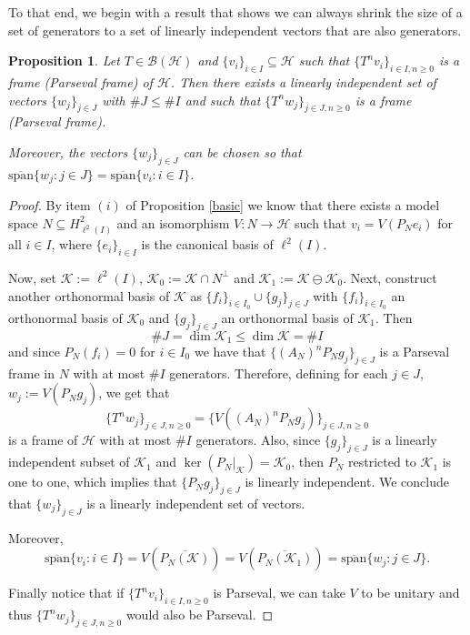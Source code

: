 \documentclass[a4paper,12pt]{amsart}
\def\cB{{\mathcal{B}}}
\def\HH{{\mathcal{H}}}
\def\KK{{\mathcal{K}}}
\def\osp{{\overline{\textrm{span}}}}
\newtheorem{proposition}[theorem]{Proposition}
\theoremstyle{definition}
\begin{document}
To that end, we begin with a result that shows we can always shrink the size of a set of generators to a set of linearly independent vectors that are also generators.
\begin{proposition}\label{lig}
Let $T\in\cB(\HH)$ and $\{v_i\}_{i\in I}\subseteq\HH$ such that $\{T^nv_i\}_{i\in I,n\geqslant0}$ is a frame (Parseval frame) of $\HH$. Then there exists a linearly independent set of vectors $\{w_j\}_{j\in J}$ with $\#J\leqslant\#I$ and such that $\{T^nw_j\}_{j\in J,n\geqslant0}$ is a frame (Parseval frame). 

Moreover, the vectors $\{w_j\}_{j\in J}$ can be chosen so that $\osp\{w_j:j\in J\}=\osp\{v_i:i\in I\}$.
\end{proposition}
\begin{proof}
By item $(i)$ of Proposition \ref{basic} we know that there exists a model space $N\subseteq H^2_{\ell^2(I)}$ and an isomorphism $V:N\to\HH$ such that $v_i=V(P_Ne_i)$ for all $i\in I$, where $\{e_i\}_{i\in I}$ is the canonical basis of $\ell^2(I)$. 

Now, set $\KK:=\ell^2(I)$, $\KK_0:=\KK\cap N^\perp$ and $\KK_1:=\KK\ominus\KK_0$. Next, construct another orthonormal basis of $\KK$ as $\{f_i\}_{i\in I_0}\cup\{g_j\}_{j\in J}$ with $\{f_i\}_{i\in I_0}$ an orthonormal basis of $\KK_0$ and $\{g_j\}_{j\in J}$  an orthonormal basis of $\KK_1$. Then\begin{equation*}
\#J=\dim\KK_1\leqslant\dim\KK=\#I
\end{equation*}
and since $P_N(f_i) = 0$ for $i\in I_0$ we have that
 $\{(A_N)^nP_Ng_j\}_{j\in J}$ is a Parseval frame in $N$ with at most $\#I$ generators. Therefore, defining for each $j\in J$, $w_j:=V(P_Ng_j)$, we get that
\begin{equation*}
\{T^nw_j\}_{j\in J,n\geqslant0}=\{V((A_N)^nP_Ng_j)\}_{j\in J,n\geqslant0}
\end{equation*}
is a frame of $\HH$ with at most $\#I$ generators. Also, since $\{g_j\}_{j\in J}$ is a linearly independent subset of $\KK_1$ and $\ker( P_N|_\KK)=\KK_0$, then $P_N$ restricted to $\KK_1$ is one to one, which implies that $\{P_N g_j\}_{j\in J}$ is linearly independent. We conclude that $\{w_j\}_{j\in J}$ is a linearly independent set of vectors.

Moreover, 
\begin{equation*}
\osp\{v_i:i\in I\}=V(\overline{P_N(\KK)})=V(\overline{P_N(\KK_1)})=\osp\{w_j:j\in J\}.
\end{equation*}

Finally notice that if $\{T^nv_i\}_{i\in I,n\geqslant0}$ is Parseval, we can take $V$ to be unitary and thus $\{T^nw_j\}_{j\in J,n\geqslant0}$ would also be Parseval.
\end{proof}
\end{document}
